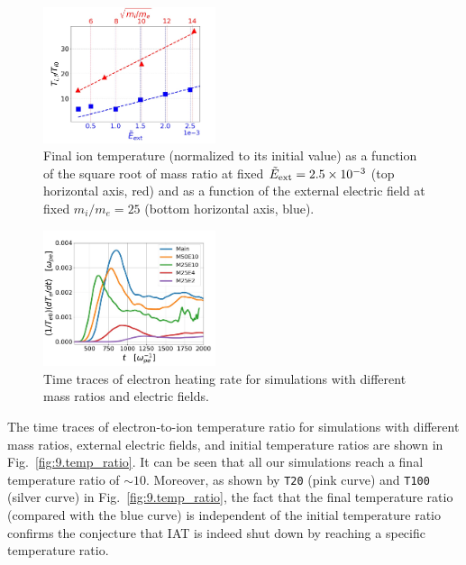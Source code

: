 \documentclass[%
 reprint,
 amsmath,
 amssymb,
 aps,
 prx,
floatfix,
superscriptaddress
]{revtex4-2}
\begin{document}
\begin{figure}[!htp]
\includegraphics[width=0.45\textwidth]{Fig10.jpeg}%
\caption{\label{fig:10.ti} Final ion temperature (normalized to its initial value) as a function of the square root of mass ratio at fixed $\tilde{E}_{\rm{ext}}=2.5 \times 10^{-3}$ (top horizontal axis, red) and as a function of the external electric field at fixed  $m_i/m_e= 25$ (bottom horizontal axis, blue).}
\end{figure}

\begin{figure}[!htp]
\includegraphics[width=0.45\textwidth]{Fig11.jpeg}%
\caption{\label{fig:11.te} Time traces of electron heating rate for simulations with different mass ratios and electric fields. }
\end{figure}

The time traces of electron-to-ion temperature ratio for simulations with different mass ratios, external electric fields, and initial temperature ratios are shown in Fig.~\ref{fig:9.temp_ratio}.
It can be seen that all our simulations reach a final temperature ratio of $\sim 10$.
Moreover, as shown by {\tt T20} (pink curve) and {\tt T100} (silver curve) in Fig.~\ref{fig:9.temp_ratio}, the fact that the final temperature ratio (compared with the blue curve) is independent of the initial temperature ratio confirms the conjecture that IAT is indeed shut down by reaching a specific temperature ratio. 
\end{document}
